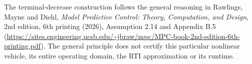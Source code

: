 \documentclass[11pt]{article}
\begin{document}
The terminal-decrease construction follows the general reasoning in Rawlings,
Mayne and Diehl, \emph{Model Predictive Control: Theory, Computation, and
Design}, 2nd edition, 6th printing (2026), Assumption 2.14 and Appendix B.5
(\url{https://sites.engineering.ucsb.edu/~jbraw/mpc/MPC-book-2nd-edition-6th-printing.pdf}).
The general principle does not certify this particular nonlinear vehicle,
its entire operating domain, the RTI approximation or its runtime.
\end{document}

